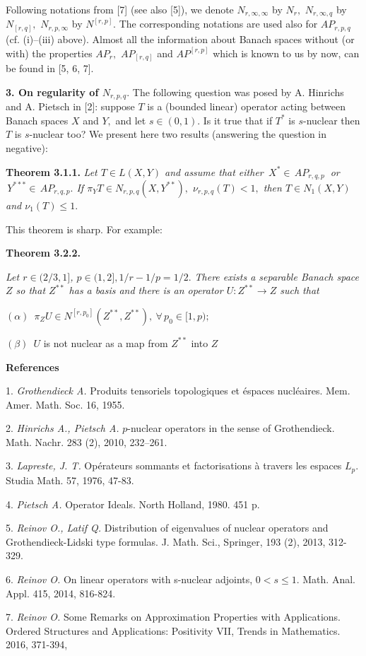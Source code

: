 Following notations from [7] (see also [5]), we denote
$N_{r,\infty,\infty}$ by $N_r,$
$N_{r,\infty,q}$ by $N_{[r,q]},$
$N_{r,p,\infty}$ by $N^{[r,p]}.$
The corresponding notations are used also for $AP_{r,p,q}$
(cf.  (i)--(iii) above).
Almost all the information about Banach spaces without (or with) the properties
 $AP_r,$ $AP_{[r,q]}$ and  $AP^{[r,p]}$ which is known to us by now,
 can be found in [5, 6, 7].
                \medskip


{\bf 3. On regularity of $N_{r,p,q}.$}
The following question was posed by A. Hinrichs and A. Pietsch  in [2]:
suppose $T$ is a (bounded linear) operator acting between Banach spaces $X$ and $Y,$
and let $s\in(0,1).$ Is it true that if $T^*$ is $s$-nuclear then $T$ is $s$-nuclear too?
We present here two results (answering the question in negative):
\smallskip

\textbf{Theorem 3.1.1.} {\it
Let  $ T\in L(X,Y)$
and assume that either
$\, X^*\in \,AP_{r,q,p}\ $ or $\, Y^{***}\in \,AP_{r,q,p}.$
If $\pi_Y T\in N_{r,p,q}(X, Y^{**}),$
     $\nu_{r,p,q}(T)<1,$
then  $T\in N_1(X,Y)$ and
      $\nu_1(T)\leqslant1.$
 }
\smallskip

This theorem is sharp. For example:

\smallskip

  \textbf{Theorem 3.2.2.} {\it
  Let $r\in(2/3,1]$, $p\in(1,2], 1/r-1/p=1/2.$
 There exists a separable Banach space $Z$ so that
   $Z^{**}$ has a ba\-sis and
 there is an operator $U:Z^{**}\to Z$ such that

  $(\alpha)$\, $\pi_ZU\in N^{[r,p_0]}(Z^{**},Z^{**}),\ \forall \, p_0\in[1,p);$

  $(\beta)$\, $U$ is not nuclear as a map from $Z^{**}$ into $Z$
}

  \smallskip
  \centerline{\bf References}\nopagebreak

1. {\it Grothendieck A.} Produits tensoriels topologiques et \'espa\-ces nucl\'eaires.
Mem. Amer. Math. Soc. 16, 1955.

2. {\it Hinrichs A.,  Pietsch A.} $p$-nuclear operators in the sense of Grothendieck.
Math. Nachr. 283 (2), 2010, 232--261.

3. {\it Lapreste, J. T.} Op\'erateurs sommants et factorisations \`a travers les espaces $L_p.$
Studia Math. 57, 1976, 47-83.

4. {\it Pietsch A.} Operator Ideals. North Holland, 1980. 451 p.

5. {\it Reinov O., Latif Q.} Distribution of eigenvalues of nuclear operators and
Grothendieck-Lidski type formulas. J. Math. Sci., Springer,
193 (2),  2013, 312-329.

6. {\it Reinov O.} On linear operators with s-nuclear adjoints, $0 < s \leqslant 1.$
Math. Anal. Appl. 415, 2014, 816-824.

7. {\it Reinov O.} Some Remarks on Approximation Properties with Applications.
Ordered Structures and Applications: Positi\-vity VII, Trends in Mathematics. 2016, 371-394,
